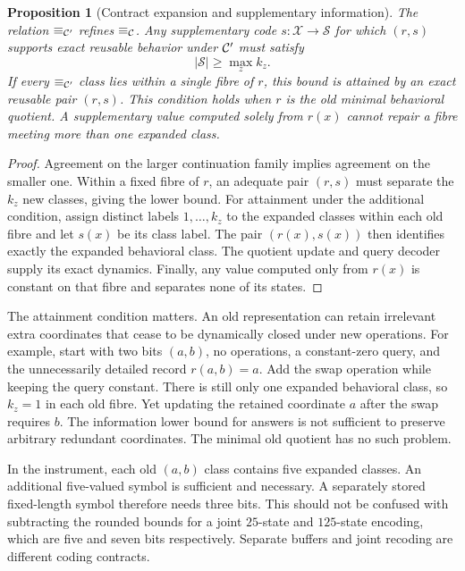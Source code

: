 \documentclass[11pt,letterpaper]{article}
\theoremstyle{plain}
\newtheorem{proposition}[theorem]{Proposition}
\theoremstyle{definition}
\newcommand{\X}{\mathcal X}\newcommand{\Z}{\mathcal Z}
\begin{document}
\begin{proposition}[Contract expansion and supplementary information]\label{prop:expansion}
The relation $\equiv_{\mathcal C'}$ refines $\equiv_{\mathcal C}$. Any supplementary code $s:\X\to\mathcal S$ for which $(r,s)$ supports exact reusable behavior under $\mathcal C'$ must satisfy
\[
|\mathcal S|\geq\max_z k_z.
\]
If every $\equiv_{\mathcal C'}$ class lies within a single fibre of $r$, this bound is attained by an exact reusable pair $(r,s)$. This condition holds when $r$ is the old minimal behavioral quotient. A supplementary value computed solely from $r(x)$ cannot repair a fibre meeting more than one expanded class.
\end{proposition}
\begin{proof}
Agreement on the larger continuation family implies agreement on the smaller one. Within a fixed fibre of $r$, an adequate pair $(r,s)$ must separate the $k_z$ new classes, giving the lower bound. For attainment under the additional condition, assign distinct labels $1,\ldots,k_z$ to the expanded classes within each old fibre and let $s(x)$ be its class label. The pair $(r(x),s(x))$ then identifies exactly the expanded behavioral class. The quotient update and query decoder supply its exact dynamics. Finally, any value computed only from $r(x)$ is constant on that fibre and separates none of its states.
\end{proof}

The attainment condition matters. An old representation can retain irrelevant extra coordinates that cease to be dynamically closed under new operations. For example, start with two bits $(a,b)$, no operations, a constant-zero query, and the unnecessarily detailed record $r(a,b)=a$. Add the swap operation while keeping the query constant. There is still only one expanded behavioral class, so $k_z=1$ in each old fibre. Yet updating the retained coordinate $a$ after the swap requires $b$. The information lower bound for answers is not sufficient to preserve arbitrary redundant coordinates. The minimal old quotient has no such problem.

In the instrument, each old $(a,b)$ class contains five expanded classes. An additional five-valued symbol is sufficient and necessary. A separately stored fixed-length symbol therefore needs three bits. This should not be confused with subtracting the rounded bounds for a joint $25$-state and $125$-state encoding, which are five and seven bits respectively. Separate buffers and joint recoding are different coding contracts.
\end{document}
